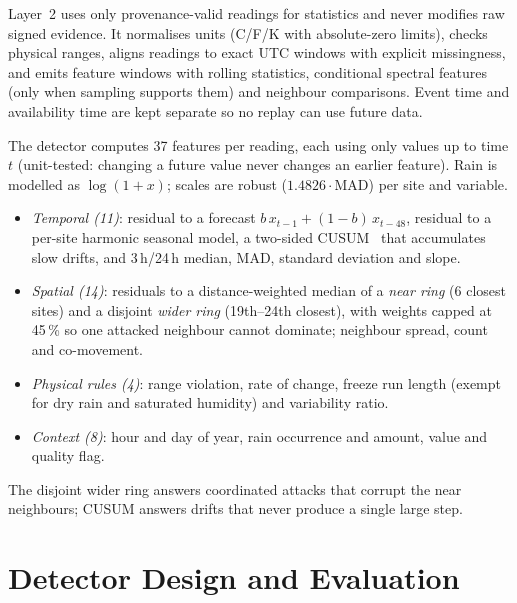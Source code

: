 \documentclass[conference]{IEEEtran}
\begin{document}
Layer~2 uses only provenance-valid readings for statistics and never modifies raw signed evidence. It
normalises units (\textdegree C/\textdegree F/K with absolute-zero limits), checks physical ranges, aligns
readings to exact UTC windows with explicit missingness, and emits feature windows with rolling statistics,
conditional spectral features (only when sampling supports them) and neighbour comparisons. Event time and
availability time are kept separate so no replay can use future data.

The detector computes 37 features per reading, each using only values up to time $t$ (unit-tested: changing
a future value never changes an earlier feature). Rain is modelled as $\log(1+x)$; scales are robust
($1.4826\cdot$MAD) per site and variable.
\begin{itemize}
\item \emph{Temporal (11)}: residual to a forecast $b\,x_{t-1}+(1-b)\,x_{t-48}$, residual to a per-site
harmonic seasonal model, a two-sided CUSUM~\cite{cusum} that accumulates slow drifts, and 3\,h/24\,h median, MAD,
standard deviation and slope.
\item \emph{Spatial (14)}: residuals to a distance-weighted median of a \emph{near ring} (6 closest sites)
and a disjoint \emph{wider ring} (19th--24th closest), with weights capped at 45\,\% so one attacked
neighbour cannot dominate; neighbour spread, count and co-movement.
\item \emph{Physical rules (4)}: range violation, rate of change, freeze run length (exempt for dry rain and
saturated humidity) and variability ratio.
\item \emph{Context (8)}: hour and day of year, rain occurrence and amount, value and quality flag.
\end{itemize}
The disjoint wider ring answers coordinated attacks that corrupt the near neighbours; CUSUM answers drifts
that never produce a single large step.

\section{Detector Design and Evaluation}
\end{document}
